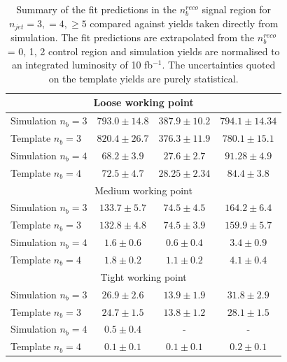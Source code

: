 \begin{table}[h!]
\begin{center}
\begin{tabular*}{0.95\textwidth}{@{\extracolsep{\fill}}lccc}
\multicolumn{4}{c}{Loose working point} \\
\hline\hline
Simulation $n_{b} = 3$ & $793.0 \pm 14.8$ & $387.9 \pm 10.2$ & $794.1 \pm 14.34$ \\
Template $n_{b} = 3$ & $820.4 \pm 26.7$ & $376.3 \pm 11.9$ & $780.1 \pm 15.1$ \\
Simulation $n_{b} = 4$ & $68.2 \pm 3.9$ & $27.6 \pm 2.7$ & $91.28 \pm 4.9$ \\
Template $n_{b} = 4$ & $72.5 \pm 4.7$ & $28.25 \pm 2.34$ & $84.4 \pm 3.8$ \\
\hline
\multicolumn{4}{c}{Medium working point} \\
\hline\hline
Simulation $n_{b} = 3$ & $133.7 \pm 5.7$ & $74.5 \pm 4.5$ & $164.2 \pm 6.4$ \\
Template $n_{b} = 3$ & $132.8 \pm 4.8$ & $74.5 \pm 3.9$ & $159.9 \pm 5.7$ \\
Simulation $n_{b} = 4$ & $1.6 \pm 0.6$ & $0.6 \pm 0.4$ & $3.4 \pm 0.9$ \\
Template $n_{b} = 4$ & $1.8 \pm 0.2$ & $1.1 \pm 0.2$ & $4.1 \pm 0.4$ \\
\hline
\multicolumn{4}{c}{Tight working point} \\
\hline\hline
Simulation $n_{b} = 3$ & $26.9 \pm 2.6$ & $13.9 \pm 1.9$ & $31.8 \pm 2.9$ \\
Template $n_{b} = 3$ & $24.7 \pm 1.5$ & $13.8 \pm 1.2$ & $28.1 \pm 1.5$ \\
Simulation $n_{b} = 4$ & $0.5 \pm 0.4$ &  -  & - \\
Template $n_{b} = 4$ & $0.1 \pm 0.1$ & $0.1 \pm 0.1$ & $0.2 \pm 0.1$ \\
\end{tabular*}
\end{center}
\caption[Summary of the fit predictions in the $n_{b}^{reco}$ signal region for $n_{jet} = 3, = 4, \geq 5$ compared against yields taken directly from simulation. The fit region is $n_{b}^{reco}$ = 0, 1, 2 and simulation yields are normalised to an integrated luminosity of 10 fb$^{-1}$. ]{Summary of the fit predictions in the $n_{b}^{reco}$ signal region for $n_{jet} = 3, = 4, \geq 5$ compared against yields taken directly from simulation. The fit predictions are extrapolated from the $n_{b}^{reco}$ = 0, 1, 2 control region and simulation yields are normalised to an integrated luminosity of 10 fb$^{-1}$. The uncertainties quoted on the template yields are purely statistical.}\label{tab:template_mctable}
\end{table}

